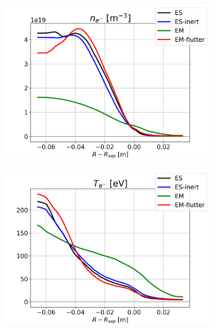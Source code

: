 \begin{figure}[H]\centering
	\begin{subfigure}[t]{0.30\textwidth}
		\centering
		\includegraphics[width=1\textwidth]{schemes/OMP_profiles_e-_n.png}
	\end{subfigure}
	\begin{subfigure}[t]{0.30\textwidth}
		\centering
		\includegraphics[width=1\textwidth]{schemes/OMP_profiles_e-_T.png}
	\end{subfigure}
	\begin{subfigure}[t]{0.30\textwidth}
		\centering

\end{subfigure}
\end{figure}
